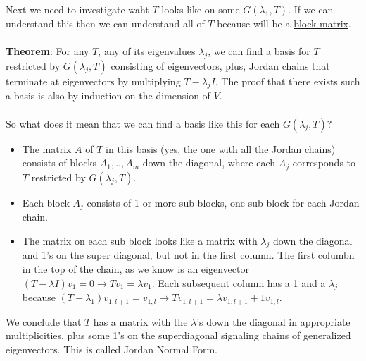 \documentclass{article}
\begin{document}
Next we need to investigate waht $T$ looks like on some $G(\lambda_1, T)$. If we can understand this then we can understand all of $T$ because will be a \underline{block matrix}. \\\\
\textbf{Theorem}: For any $T$, any of its eigenvalues $\lambda_j$, we can find a basis for $T$ restricted by $G(\lambda_j, T)$ consisting of eigenvectors, plus, Jordan chains that terminate at eigenvectors by multiplying $T - \lambda_j I$. The proof that there exists such a basis is also by induction on the dimension of $V$. \\\\
So what does it mean that we can find a basis like this for each $G(\lambda_j, T) $?
\begin{itemize}
    \item The matrix $A$ of $T$ in this basis (yes, the one with all the Jordan chains) consists of blocks $A_1, .., A_m$ down the diagonal, where each $A_j$ corresponds to $T$ restricted by $G(\lambda_j, T)$. 
    \item Each block $A_j$ consists of 1 or more sub blocks, one sub block for each Jordan chain. 
    \item The matrix on each sub block looks like a matrix with $\lambda_j$ down the diagonal and 1's on the super diagonal, but not in the first column. The first columbn in the top of the chain, as we know is an eigenvector $(T-\lambda I)v_1 = 0 \rightarrow Tv_1 = \lambda v_1$. Each subsequent column has a 1 and a $\lambda_j$ because $(T-\lambda_1)v_{1,l+1} = v_{1, l} \rightarrow Tv_{1, l+1} = \lambda v_{1, l+1} + 1 v_{1, l}$. 
\end{itemize}
We conclude that $T$ has a matrix with the $\lambda$'s down the diagonal in appropriate multiplicities, plus some 1's on the superdiagonal signaling chains of generalized eigenvectors. This is called Jordan Normal Form. 
\end{document}
